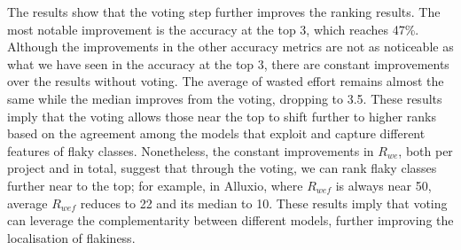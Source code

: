 The results show that the voting step further improves the ranking results.
The most notable improvement is the accuracy at the top 3, which reaches 47\%. Although the improvements in the other accuracy metrics are not as noticeable as what we have seen in the accuracy at the top 3, there are constant improvements over the results without voting. 
The average of wasted effort remains almost the same while the median improves from the voting, dropping to 3.5. These results imply that the voting allows those near the top to shift further to higher ranks based on the agreement among the models that exploit and capture different features of flaky classes.
Nonetheless, the constant improvements in $R_{we}$, both per project and in total, suggest that through the voting, we can rank flaky classes further near to the top; for example, in Alluxio, where $R_{wef}$ is always near 50, average $R_{wef}$ reduces to 22 and its median to 10. 
These results imply that voting can leverage the complementarity between different models, further improving the localisation of flakiness.

\begin{table}[ht]
\caption{RQ3: The effectiveness of the voting between 60 different GP-evolved models, 30 from SBFL with change metrics, and 30 from using SBFL with size metrics. `Perc' denotes Percentage \label{tab:RQ3-voting}\centering}
\centering
{}
\end{table}

